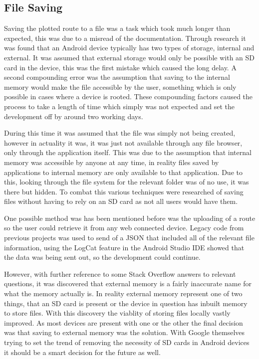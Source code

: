 \subsection{File Saving}
Saving the plotted route to a file was a task which took much longer than expected, this was due to a misread of the documentation. Through research it was found that an Android device typically has two types of storage, internal and external. It was assumed that external storage would only be possible with an SD card in the device, this was the first mistake which caused the long delay. A second compounding error was the assumption that saving to the internal memory would make the file accessible by the user, something which is only possible in cases where a device is rooted. These compounding factors caused the process to take a length of time which simply was not expected and set the development off by around two working days. 

During this time it was assumed that the file was simply not being created, however in actuality it was, it was just not available through any file browser, only through the application itself. This was due to the assumption that internal memory was accessible by anyone at any time, in reality files saved by applications to internal memory are only available to that application. Due to this, looking through the file system for the relevant folder was of no use, it was there but hidden. To combat this various techniques were researched of saving files without having to rely on an SD card as not all users would have them. 

One possible method was has been mentioned before was the uploading of a route so the user could retrieve it from any web connected device. Legacy code from previous projects was used to send of a JSON that included all of the relevant file information, using the LogCat feature in the Android Studio IDE showed that the data was being sent out, so the development could continue.

However, with further reference to some Stack Overflow answers to relevant questions, it was discovered that external memory is a fairly inaccurate name for what the memory actually is. In reality external memory represent one of two things, that an SD card is present or the device in question has inbuilt memory to store files. With this discovery the viablity of storing files locally vastly improved. As most devices are present with one or the other the final decision was that saving to external memory was the solution. With Google themselves trying to set the trend of removing the necessity of SD cards in Android devices it should be a smart decision for the future as well. 

